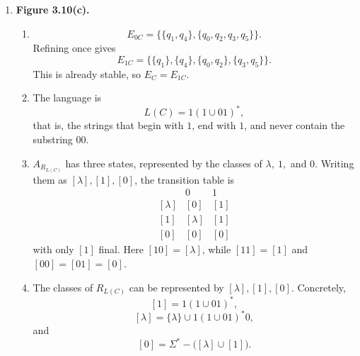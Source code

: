 \begin{enumerate}[{3.}1.]
\begin{enumerate}
\item $A_{R_{L(B)}}$ is the two-state DFA with states $[\lambda]$ and
$[\mathbf{0}]$ (equivalently, $[\mathbf{1}]$), where $[\lambda]$ is initial
and final, $[\mathbf{0}]$ is nonfinal, and both letters send
$[\mathbf{0}]$ to itself.

\item $R_{L(B)}$ has exactly two classes:
\[
[\lambda]=\{\lambda\}, \qquad [\mathbf{0}]=\Sigma^+.
\]

\item $B/_{E_B}$ has states $[t_0]$ and $[t_1]=[t_2]=[t_3]$, with
$[t_0]$ initial and final, and
\[
\delta([t_0],0)=\delta([t_0],1)=[t_1]=[t_2]=[t_3],
\]
while both letters fix $[t_1]=[t_2]=[t_3]$. Thus
$B/_{E_B}\cong A_{R_{L(B)}}$.
\end{enumerate}

\item \textbf{Figure 3.10(c).}

\begin{enumerate}
\item
\[
E_{0C}=\{\{q_1,q_4\},\{q_0,q_2,q_3,q_5\}\}.
\]
Refining once gives
\[
E_{1C}=\{\{q_1\},\{q_4\},\{q_0,q_2\},\{q_3,q_5\}\}.
\]
This is already stable, so $E_C=E_{1C}$.

\item The language is
\[
L(C)=1(1\cup 01)^*,
\]
that is, the strings that begin with $1$, end with $1$, and never contain the
substring $00$.

\item $A_{R_{L(C)}}$ has three states, represented by the classes of
$\lambda,\ 1,$ and $0$. Writing them as $[\lambda], [1], [0]$, the transition
table is
\[
\begin{array}{c|cc}
 & 0 & 1\\\hline
{}[\lambda] & [0] & [1]\\
{}[1] & [\lambda] & [1]\\
{}[0] & [0] & [0]
\end{array}
\]
with only $[1]$ final. Here $[10]=[\lambda]$, while $[11]=[1]$ and
$[00]=[01]=[0]$.

\item The classes of $R_{L(C)}$ can be represented by
$[\lambda], [1], [0]$. Concretely,
\[
[1]=1(1\cup 01)^*,
\]
\[
[\lambda]=\{\lambda\}\cup 1(1\cup 01)^*0,
\]
and
\[
[0]=\Sigma^* - \big([\lambda]\cup[1]\big).
\]


\end{enumerate}
\end{enumerate}
